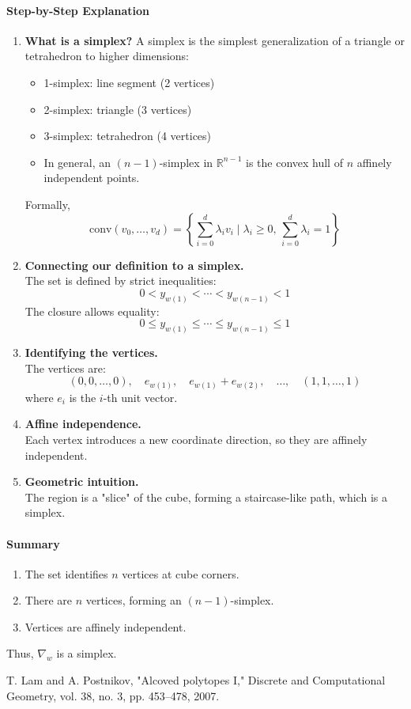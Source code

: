 \documentclass[12pt]{article}
\theoremstyle{definition}
\numberwithin{equation}{subsection}
\begin{document}
\paragraph{Step-by-Step Explanation}
\begin{enumerate}
    \item \textbf{What is a simplex?} 
    A simplex is the simplest generalization of a triangle or tetrahedron to higher dimensions:
    \begin{itemize}
        \item 1-simplex: line segment (2 vertices)
        \item 2-simplex: triangle (3 vertices)
        \item 3-simplex: tetrahedron (4 vertices)
        \item In general, an $(n-1)$-simplex in $\mathbb{R}^{n-1}$ is the convex hull of $n$ affinely independent points.
    \end{itemize}
    Formally,
    \[
    \text{conv}(v_0, \ldots, v_d) = \left\{ \sum_{i=0}^d \lambda_i v_i \mid \lambda_i \ge 0,\, \sum_{i=0}^d \lambda_i = 1 \right\}
    \]
    \item \textbf{Connecting our definition to a simplex.} \\
    The set is defined by strict inequalities:
    \[
    0 < y_{w(1)} < \cdots < y_{w(n-1)} < 1
    \]
    The closure allows equality:
    \[
    0 \leq y_{w(1)} \leq \cdots \leq y_{w(n-1)} \leq 1
    \]
    \item \textbf{Identifying the vertices.} \\
    The vertices are:
    \[
    (0,0,\dots,0),\quad e_{w(1)},\quad e_{w(1)}+e_{w(2)},\quad \dots,\quad (1,1,\dots,1)
    \]
    where $e_i$ is the $i$-th unit vector.
    \item \textbf{Affine independence.} \\
    Each vertex introduces a new coordinate direction, so they are affinely independent.
    \item \textbf{Geometric intuition.} \\
    The region is a "slice" of the cube, forming a staircase-like path, which is a simplex.
\end{enumerate}

\paragraph{Summary}
\begin{enumerate}
    \item The set identifies $n$ vertices at cube corners.
    \item There are $n$ vertices, forming an $(n-1)$-simplex.
    \item Vertices are affinely independent.
\end{enumerate}
Thus, $\nabla_w$ is a simplex.





\begin{thebibliography}{1}

T. Lam and A. Postnikov, "Alcoved polytopes I," Discrete and Computational Geometry, vol. 38, no. 3, pp. 453--478, 2007.

\end{thebibliography}
\end{document}
